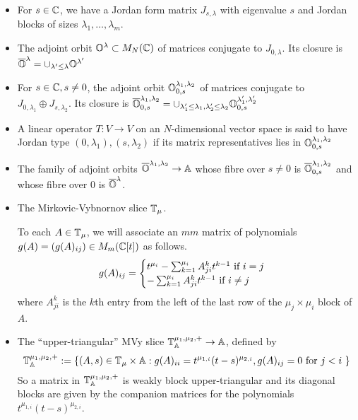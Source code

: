 \documentclass{article}
\begin{document}
\begin{itemize}
    \item For $ s \in \mathbb C$, we have a Jordan form matrix $ J_{s,\lambda}$ with eigenvalue $ s$ and Jordan blocks of sizes $ \lambda_1, \dots, \lambda_m$.
    \item The adjoint orbit $ \mathbb O^\lambda \subset M_N(\mathbb C)$ of matrices conjugate to $ J_{0,\lambda}$.  Its closure is $ \overline{\mathbb O}^\lambda = \cup_{\lambda' \le \lambda} \mathbb O^{\lambda'}$
    \item For $ s \in \mathbb C, s \ne 0$, the adjoint orbit $ \mathbb O^{\lambda_1, \lambda_2}_{0,s}$ of matrices conjugate to $ J_{0,\lambda_1} \oplus J_{s,\lambda_2}$.  Its closure is $ \overline{\mathbb O}^{\lambda_1, \lambda_2}_{0,s} = \cup_{\lambda_1' \le \lambda_1, \lambda'_2 \le \lambda_2} \mathbb O^{\lambda_1', \lambda'_2}_{0,s}$
    
    \item A linear operator $ T : V \rightarrow V $ on an $N$-dimensional vector space is said to have Jordan type $(0,\lambda_1), (s,\lambda_2)$ if its matrix representatives lies in $ \mathbb O^{\lambda_1, \lambda_2}_{0,s}$
    \item The family of adjoint orbits $ \overline{\mathbb O}^{\lambda_1, \lambda_2} \rightarrow \mathbb A$ whose fibre over $ s \ne 0 $ is $ \overline{\mathbb O}^{\lambda_1, \lambda_2}_{0,s}$ and whose fibre over 0 is $\overline{\mathbb O}^\lambda$.  
    
    \item The Mirkovic-Vybnornov slice $\mathbb T_\mu$.  
    
    To each $ A \in \mathbb T_\mu$, we will associate an $m$\times$m$ matrix of polynomials $ g(A) = \left( g(A)_{ij} \right) \in M_m(\mathbb C[t]) $ as follows.
       \begin{equation}
            g(A)_{ij} = \begin{cases} t^{\mu_i} - \sum_{k=1}^{\mu_i} A^k_{ji} t^{k-1} \text{ if $ i = j$} \\
             - \sum_{k=1}^{\mu_i} A^k_{ji} t^{k-1} \text{ if $ i \ne j$ }
        \end{cases}
    \end{equation}
    where $A^k_{ji}$ is the $k$th entry from the left of the last row of the $\mu_j\times\mu_i$ block of $A$. 
    
    \item The ``upper-triangular'' MVy slice $\mathbb T^{\mu_1, \mu_2,+}_\mathbb A \rightarrow \mathbb A $, defined by
    $$
    \mathbb T^{\mu_1, \mu_2,+}_\mathbb A := \{ (A,s) \in \mathbb T_\mu \times \mathbb A : g(A)_{ii} = t^{\mu_{1,i}} (t-s)^{\mu_{2,i}}, g(A)_{ij} = 0 \text{ for $ j < i $ }\}
    $$
    So a matrix in $\mathbb T^{\mu_1, \mu_2,+}_\mathbb A  $ is weakly block upper-triangular and its diagonal blocks are given by the companion matrices for the polynomials $t^{\mu_{1,i}} (t-s)^{\mu_{2,i}}$.
    

\end{itemize}
\end{document}
